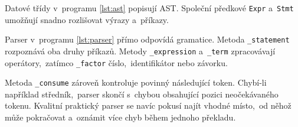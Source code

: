 Datové třídy v~programu \ref{lst:ast} popisují AST. Společní předkové \texttt{Expr} a~\texttt{Stmt} umožňují snadno rozlišovat výrazy a~příkazy.



Parser v~programu \ref{lst:parser} přímo odpovídá gramatice. Metoda \texttt{\_statement} rozpoznává oba druhy příkazů. Metody \texttt{\_expression} a~\texttt{\_term} zpracovávají operátory,~zatímco \texttt{\_factor} číslo,~identifikátor nebo závorku.



Metoda \texttt{\_consume} zároveň kontroluje povinný následující token. Chybí-li například středník,~parser skončí s~chybou obsahující pozici neočekávaného tokenu. Kvalitní praktický parser se navíc pokusí najít vhodné místo,~od něhož může pokračovat a~oznámit více chyb během jednoho překladu.
